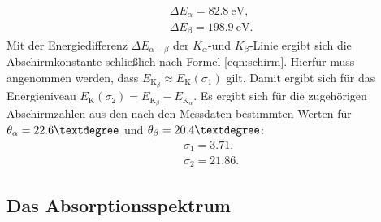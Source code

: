 \begin{gather*}
	\Delta E_{\alpha}=\SI{82.8}{\electronvolt}\text{,}\\
	\Delta E_{\beta}=\SI{198.9}{\electronvolt} \text{.}
\end{gather*}
Mit der Energiedifferenz $\Delta E_{\alpha-\beta}$ der $K_\alpha$-und $K_\beta$-Linie ergibt sich die Abschirmkonstante schließlich nach Formel \eqref{eqn:schirm}.
Hierfür muss angenommen werden, dass $E_{\mathrm{K}_\beta}\approx E_\mathrm{K}(\sigma_1)$ gilt. Damit ergibt sich für das Energieniveau $E_\mathrm{K}(\sigma_2)=E_{\mathrm{K}_\beta}-E_{\mathrm{K}_\alpha}$.
Es ergibt sich für die zugehörigen Abschirmzahlen aus den nach den Messdaten bestimmten Werten für $\theta_\alpha=22.6\textdegree$ und $\theta_\beta=20.4\textdegree$:
\begin{gather*}
	\sigma_1=3.71 \text{,}\\
	\sigma_2=21.86 \text{.}
\end{gather*}

\FloatBarrier
\subsection{Das Absorptionsspektrum}

